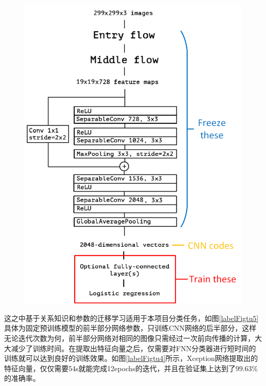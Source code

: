 \documentclass[10.5pt,twocolumn]{jbuaa}
\begin{document}
\begin{figure}[h!]
\centering
\includegraphics [scale=0.35,trim=0 0 0 0]{./image/xception.png}
\end{figure}

这之中基于关系知识和参数的迁移学习适用于本项目分类任务，如图\ref{labelFigtu5}具体为固定预训练模型的前半部分网络参数，只训练CNN网络的后半部分，这样无论迭代次数为何，前半部分网络对相同的图像只需经过一次前向传播的计算，大大减少了训练时间。在提取出特征向量之后，仅需要对FNN分类器进行短时间的训练就可以达到良好的训练效果。如图\ref{labelFigtu4}所示，Xception网络提取出的特征向量，仅仅需要54s就能完成12epochs的迭代，并且在验证集上达到了99.63\%的准确率。
\end{document}

